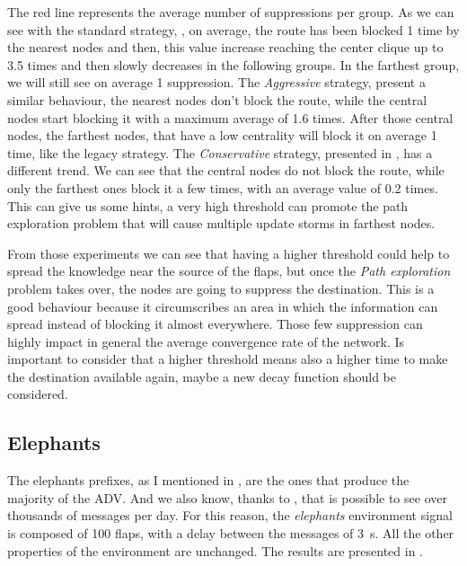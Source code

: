 The red line represents the average number of suppressions per group.
As we can see with the standard strategy, ,
on average, the route has been blocked \num{1} time by the nearest nodes and then,
this value increase reaching the center clique up to \num{3.5} times and then
slowly decreases in the following groups.
In the farthest group, we will still see on average \num{1} suppression.
The \textit{Aggressive} strategy,  present
a similar behaviour, the nearest nodes don't block the route, while the central
nodes start blocking it with a maximum average of \num{1.6} times.
After those central nodes, the farthest nodes, that have a low centrality will
block it on average \num{1} time, like the legacy strategy.
The \textit{Conservative} strategy, presented in ,
has a different trend.
We can see that the central nodes do not block the route, while only the farthest
ones block it a few times, with an average value of \num{0.2} times.
This can give us some hints, a very high threshold can promote the path
exploration problem that will cause multiple update storms in farthest nodes.

From those experiments we can see that having a higher threshold could help
to spread the knowledge near the source of the flaps, but once the
\textit{Path exploration} problem takes over, the nodes are going to suppress
the destination.
This is a good behaviour because it circumscribes an area in which the
information can spread instead of blocking it almost everywhere.
Those few suppression can highly impact in general the average convergence rate
of the network.
Is important to consider that a higher threshold means also a higher time to
make the destination available again, maybe a new decay function should be considered.


\subsection{Elephants}
\label{subsec:rfd_elephants}


The elephants prefixes, as I mentioned in ,
are the ones that produce the majority of the \ac{ADV}.
And we also know, thanks to \cite{huston2006bgp}, that is possible to see over
thousands of messages per day.
For this reason, the \textit{elephants} environment signal is composed of \num{100}
flaps, with a delay between the messages of \SI{3}{\second}.
All the other properties of the environment are unchanged.
The results are presented in .

